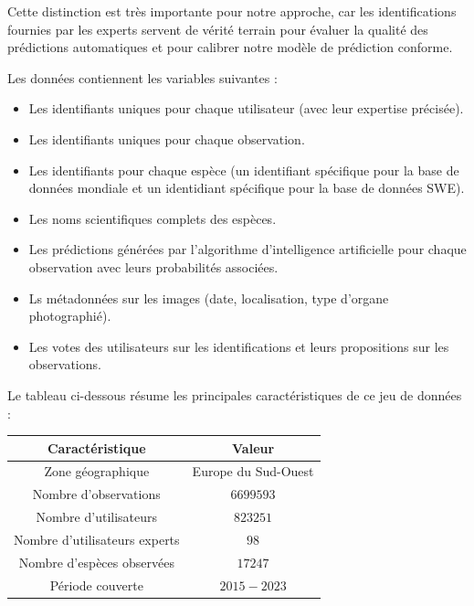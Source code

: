 \documentclass[a4paper,12pt]{article}
\begin{document}
\vspace{0.2cm}

Cette distinction est très importante pour notre approche, car les identifications fournies par les experts servent de vérité terrain pour évaluer la qualité des prédictions automatiques et pour calibrer notre modèle de prédiction conforme.

\vspace{0.2cm}

Les données contiennent les variables suivantes :
\begin{itemize}
    \item Les identifiants uniques pour chaque utilisateur (avec leur expertise précisée).
    \item Les identifiants uniques pour chaque observation.
    \item Les identifiants pour chaque espèce (un identifiant spécifique pour la base de données mondiale et un identidiant spécifique pour la base de données SWE).
    \item Les noms scientifiques complets des espèces.
    \item Les prédictions générées par l'algorithme d'intelligence artificielle pour chaque observation avec leurs probabilités associées.
    \item Ls métadonnées sur les images (date, localisation, type d'organe photographié).
    \item Les votes des utilisateurs sur les identifications et leurs propositions sur les observations.
\end{itemize}

\vspace{0.2cm}

Le tableau ci-dessous résume les principales caractéristiques de ce jeu de données :

\vspace{0.2cm}

\begin{center}
\begin{tabular}{|c|c|}
    \hline
    Caractéristique & Valeur \\
    \hline
    Zone géographique  & Europe du Sud-Ouest  \\
    Nombre d'observations & $\num{6 699 593}$  \\
    Nombre d'utilisateurs  & $\num{823 251}$  \\
    Nombre d'utilisateurs experts  & $98$  \\
    Nombre d'espèces observées  & $\num{17 247}$  \\
    Période couverte  & $2015-2023$  \\
    \hline
    \end{tabular}
\end{center}
    
\end{document}
